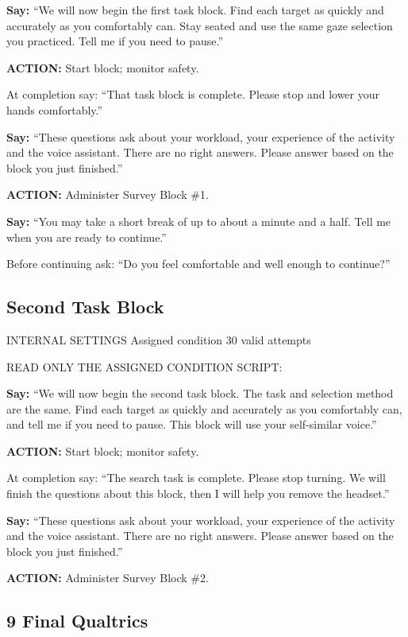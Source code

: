\textbf{Say:} ``We will now begin the first task block. Find each target as
quickly and accurately as you comfortably can. Stay seated and use the
same gaze selection you practiced. Tell me if you need to pause.''

\textbf{ACTION:} Start block; monitor safety.

At completion say: ``That task block is complete. Please stop and lower
your hands comfortably.''

\textbf{Say:} ``These questions ask about your workload, your experience of the
activity and the voice assistant. There are no right answers. Please
answer based on the block you just finished.''

\textbf{ACTION:} Administer Survey Block \#1.

\textbf{Say:} ``You may take a short break of up to about a minute and a half.
Tell me when you are ready to continue.''

Before continuing ask: ``Do you feel comfortable and well enough to
continue?''

\subsection{Second Task Block}\label{second-task-block}

INTERNAL SETTINGS \textbar{} Assigned condition \textbar{} 30 valid
attempts

READ ONLY THE ASSIGNED CONDITION SCRIPT:

\textbf{Say:} ``We will now begin the second task block. The task and selection
method are the same. Find each target as quickly and accurately as you
comfortably can, and tell me if you need to pause. This block will use
your self-similar voice.''

\textbf{ACTION:} Start block; monitor safety.

At completion say: ``The search task is complete. Please stop turning.
We will finish the questions about this block, then I will help you
remove the headset.''

\textbf{Say:} ``These questions ask about your workload, your experience of the
activity and the voice assistant. There are no right answers. Please
answer based on the block you just finished.''

\textbf{ACTION:} Administer Survey Block \#2.

\subsection{9 Final Qualtrics}\label{final-qualtrics}

